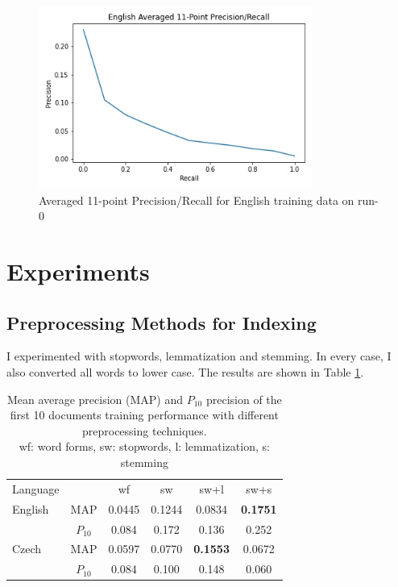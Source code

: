 \documentclass[a4paper]{article}
\begin{document}
\begin{figure}[htpb]
	\centering
	\includegraphics[width=0.8\textwidth]{plot_run-0_en_precision_recall.jpg}
	\caption{Averaged 11-point Precision/Recall for English training data on run-0}
	\label{fig:en_train}
\end{figure}

\section{Experiments}

\subsection{Preprocessing Methods for Indexing}
\label{sec:preproc}
I experimented with stopwords, lemmatization and stemming. In every case, I also
converted all words to lower case. The results are shown in Table
\ref{tab:terms}. 

\begin{table}[htpb]
	\centering
	\caption{Mean average precision (MAP) and $P_{10}$ precision of the first 10
		documents training performance with different preprocessing techniques.\\
	wf: word forms, sw: stopwords, l: lemmatization, s: stemming\\}
	\label{tab:terms}
	\begin{tabular}{@{}l|ccccc@{}}
		\toprule
		Language & & wf & sw & sw+l & sw+s \\
		\cmidrule(r){1-1}\cmidrule(lr){2-2}\cmidrule(lr){3-3}\cmidrule(lr){4-4}\cmidrule(lr){5-5}\cmidrule(l){6-6}
		English & MAP & 0.0445 & 0.1244 & 0.0834 & \textbf{0.1751} \\
				& \small{$P_{10}$} & \small{0.084} & \small{0.172} & \small{0.136} & \small{0.252} \\
		\cmidrule(r){1-1}\cmidrule(lr){2-2}\cmidrule(lr){3-3}\cmidrule(lr){4-4}\cmidrule(lr){5-5}\cmidrule(l){6-6}
		Czech & MAP & 0.0597 & 0.0770 & \textbf{0.1553} & 0.0672 \\
			  & \small{$P_{10}$} & \small{0.084} & \small{0.100} & \small{0.148} & \small{0.060} \\
		\bottomrule
	\end{tabular}
\end{table}
\end{document}
